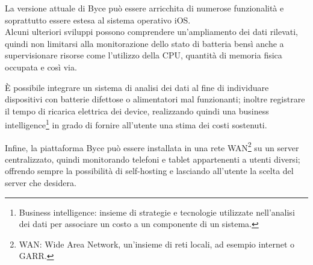 \documentclass[target=bach]{thud}
\begin{document}
La versione attuale di Byce può essere arricchita di numerose funzionalità e soprattutto essere estesa al sistema operativo iOS.\\
Alcuni ulteriori sviluppi possono comprendere un'ampliamento dei dati rilevati, quindi non limitarsi alla monitorazione dello stato di batteria bensì anche a supervisionare risorse come l'utilizzo della CPU, quantità di memoria fisica occupata e così via.

\`E possibile integrare un sistema di analisi dei dati al fine di individuare dispositivi con batterie difettose o alimentatori mal funzionanti; inoltre registrare il tempo di ricarica elettrica dei device, realizzando quindi una business intelligence\footnote[1]{Business intelligence: insieme di strategie e tecnologie utilizzate nell'analisi dei dati per associare un costo a un componente di un sistema.} in grado di fornire all'utente una stima dei costi sostenuti.

Infine, la piattaforma Byce può essere installata in una rete WAN\footnote[2]{WAN: Wide Area Network, un'insieme di reti locali, ad esempio internet o GARR.} su un server centralizzato, quindi monitorando telefoni e tablet appartenenti a utenti diversi; offrendo sempre la possibilità di self-hosting e lasciando all'utente la scelta del server che desidera.


\appendix




\backmatter
\end{document}
